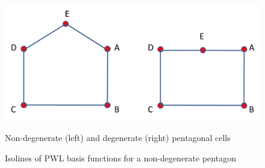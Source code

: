\documentclass[preprint,10pt]{elsarticle}
\begin{document}
\begin{figure}[!hbtp]
\centering
\includegraphics[scale=0.77]{pentagons.png}
\label{fig:pentagons}
\caption{Non-degenerate (left) and degenerate (right) pentagonal cells}
\end{figure}
%
%
\begin{figure}[!hbtp]
\centering
{}
\caption{Isolines of PWL basis functions for a non-degenerate pentagon}
\label{fig:pwl_pentagon}
\end{figure}
\end{document}
